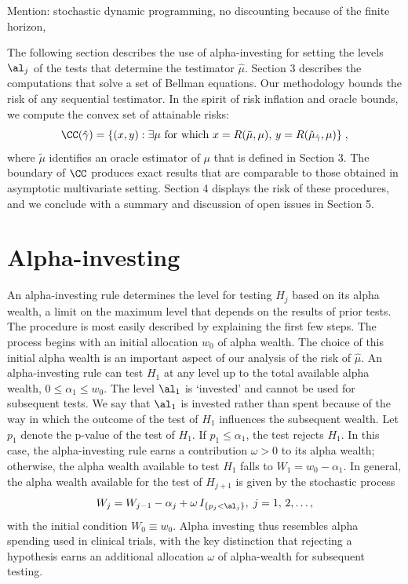 \documentclass[12pt]{article}
\begin{document}
 Mention: stochastic dynamic programming, no discounting because of the finite
horizon, 

 The following section describes the use of alpha-investing for setting the
 levels $\al_j$ of the tests that determine the testimator $\hat\mu$.  Section 3
 describes the computations that solve a set of Bellman equations.  Our
 methodology bounds the risk of any sequential testimator.  In the spirit of
 risk inflation and oracle bounds, we compute the convex set of attainable
 risks:
 \begin{equation}
   \CC(\hat\gamma) 
      = \{(x,y): \exists \mu \mbox{ for which }
                 x=R(\tilde\mu,\mu), \, y = R(\hat\mu_{\hat\gamma},\mu)\} \;,
 \label{eq:C}
 \end{equation}
 where $\tilde\mu$ identifies an oracle estimator of $\mu$ that is defined in
 Section 3.  The boundary of $\CC$ produces exact results that are comparable to
 those obtained in asymptotic multivariate setting.  Section 4 displays the risk
 of these procedures, and we conclude with a summary and discussion of open
 issues in Section 5.


\section{ Alpha-investing }

 An alpha-investing rule \citep{fosterstine08} determines the level for testing
 $H_j$ based on its alpha wealth, a limit on the maximum level that depends on
 the results of prior tests.  The procedure is most easily described by
 explaining the first few steps.  The process begins with an initial allocation
 $w_0$  of alpha wealth.  The choice of this initial alpha
 wealth is an important aspect of our analysis of the risk of $\hat\mu$.  An
 alpha-investing rule can test $H_1$ at any level up to the total available
 alpha wealth, $0 \le \alpha_1 \le w_0$.  The level $\al_1$ is `invested' and
 cannot be used for subsequent tests.  We say that $\al_1$ is invested rather
 than spent because of the way in which the outcome of the test of $H_1$
 influences the subsequent wealth.  Let $p_1$ denote the p-value of the test of
 $H_1$.  If $p_1 \le \alpha_1$, the test rejects $H_1$.  In this case, the
 alpha-investing rule earns a contribution $\omega > 0$ \marginpar{$\omega$} to
 its alpha wealth; otherwise, the alpha wealth available to test $H_1$ falls to
 $W_1 = w_0 - \alpha_1$.  In general, the alpha wealth available for the test of
 $H_{j+1}$ is given by the stochastic process 
 \begin{equation}
    W_j = W_{j-1} - \alpha_j + \omega \, I_{\{p_j < \al_j\}}, \; j = 1,\,2,\ldots,
 \label{eq:Wj}
 \end{equation}
 with the initial condition $W_0 \equiv w_0$.  Alpha investing thus resembles
 alpha spending used in clinical trials, with the key distinction that rejecting
 a hypothesis earns an additional allocation $\omega$ of alpha-wealth for
 subsequent testing.  
\end{document}
